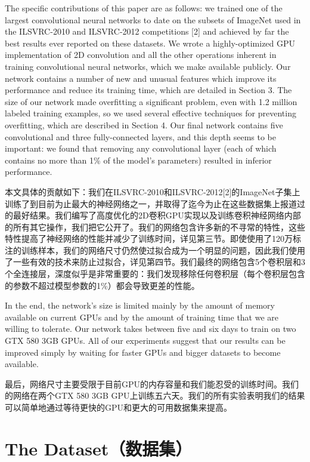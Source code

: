 \documentclass[12pt,a4paper,UTF8,twoside]{book}
\begin{document}
The specific contributions of this paper are as follows: we trained one of the largest convolutional neural networks to date on the subsets of ImageNet used in the ILSVRC-2010 and ILSVRC-2012 competitions {[}2{]} and achieved by far the best results ever reported on these datasets. We wrote a highly-optimized GPU implementation of 2D convolution and all the other operations inherent in training convolutional neural networks, which we make available publicly. Our network contains a number of new and unusual features which improve its performance and reduce its training time, which are detailed in Section 3. The size of our network made overfitting a significant problem, even with 1.2 million labeled training examples, so we used several effective techniques for preventing overfitting, which are described in Section 4. Our final network contains five convolutional and three fully-connected layers, and this depth seems to be important: we found that removing any convolutional layer (each of which contains no more than 1\% of the model's parameters) resulted in inferior performance.

本文具体的贡献如下：我们在ILSVRC-2010和ILSVRC-2012{[}2{]}的ImageNet子集上训练了到目前为止最大的神经网络之一，并取得了迄今为止在这些数据集上报道过的最好结果。我们编写了高度优化的2D卷积GPU实现以及训练卷积神经网络内部的所有其它操作，我们把它公开了。我们的网络包含许多新的不寻常的特性，这些特性提高了神经网络的性能并减少了训练时间，详见第三节。即使使用了120万标注的训练样本，我们的网络尺寸仍然使过拟合成为一个明显的问题，因此我们使用了一些有效的技术来防止过拟合，详见第四节。我们最终的网络包含5个卷积层和3个全连接层，深度似乎是非常重要的：我们发现移除任何卷积层（每个卷积层包含的参数不超过模型参数的1\%）都会导致更差的性能。

In the end, the network's size is limited mainly by the amount of memory available on current GPUs and by the amount of training time that we are willing to tolerate. Our network takes between five and six days to train on two GTX 580 3GB GPUs. All of our experiments suggest that our results can be improved simply by waiting for faster GPUs and bigger datasets to become available.

最后，网络尺寸主要受限于目前GPU的内存容量和我们能忍受的训练时间。我们的网络在两个GTX 580 3GB GPU上训练五六天。我们的所有实验表明我们的结果可以简单地通过等待更快的GPU和更大的可用数据集来提高。

\hypertarget{the-datasetux6570ux636eux96c6}{%
\section{The Dataset（数据集）}\label{the-datasetux6570ux636eux96c6}}
\end{document}
